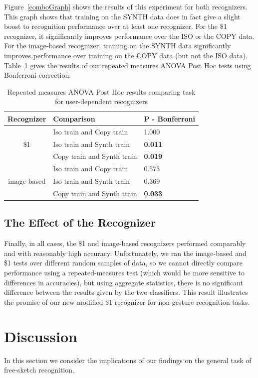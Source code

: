 \documentclass{egpubl}
\begin{document}
Figure~\ref{comboGraph} shows the results of this experiment for both recognizers.  This graph shows that training on the SYNTH data does in fact give a slight boost to recognition performance over at least one recognizer.  For the \$1 recognizer, it significantly improves performance over the ISO or the COPY data.  For the image-based recognizer, training on the SYNTH data significantly improves performance over training on the COPY data (but not the ISO data).  Table~\ref{anovaTable2} gives the results of our repeated measures ANOVA Post Hoc tests using Bonferroni correction.



\begin{table}
\begin{tabular}{|c|l|l|}
\hline
Recognizer & Comparison & P - Bonferroni \\
\hline
 & Iso train and Copy train & 1.000 \\
\$1 & Iso train and Synth train & \textbf{0.011} \\
 & Copy train and Synth train & \textbf{0.019} \\
\hline
 & Iso train and Copy train  & 0.573 \\
image-based & Iso train and Synth train & 0.369 \\
 & Copy train and Synth train & \textbf{0.033} \\
 \hline
\end{tabular}
\caption{Repeated measures ANOVA Post Hoc results comparing task for user-dependent recognizers}
\label{anovaTable2}
\end{table}

\subsection{The Effect of the Recognizer}
Finally, in all cases, the \$1 and image-based recognizers performed comparably and with reasonably high accuracy.  Unfortunately, we ran the image-based and \$1 tests over different random samples of data, so we cannot directly compare performance using a repeated-measures test (which would be more sensitive to differences in accuracies), but using aggregate statistics, there is no significant difference between the results given by the two classifiers.  This result illustrates the promise of our new modified \$1 recognizer for non-gesture recognition tasks.

\section{Discussion}
In this section we consider the implications of our findings on the general task of free-sketch recognition.  
\end{document}
